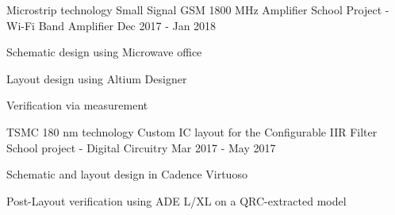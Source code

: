 \begin{cventries}

\cventry
{Microstrip technology} %
{Small Signal GSM 1800 MHz Amplifier} %
{School Project - Wi-Fi Band Amplifier} %
{Dec 2017 - Jan 2018} %
{ %
\begin{cvitems}
    \item {Schematic design using Microwave office}
    \item {Layout design using Altium Designer}
    \item {Verification via measurement} %
\end{cvitems}
}


\cventry
{TSMC 180 nm technology} %
{Custom IC layout for the Configurable IIR Filter} %
{School project - Digital Circuitry} %
{Mar 2017 - May 2017} %
{ %
\begin{cvitems}
    \item {Schematic and layout design in Cadence Virtuoso}
    \item {Post-Layout verification using ADE L/XL on a QRC-extracted model}
\end{cvitems}
}



\end{cventries}
